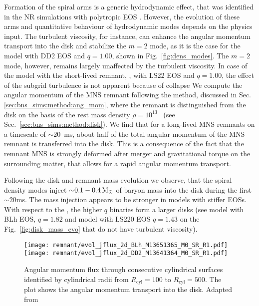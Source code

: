 Formation of the spiral arms is a generic hydrodynamic effect, that was identified 
in the \ac{NR} simulations with polytropic \ac{EOS} \citep{Bernuzzi:2013rza,Radice:2016gym}.
However, the evolution of these arms and quantitative behaviour of hydrodynamic
modes depends on the physics input. The turbulent viscosity, for instance, 
can enhance the angular momentum transport into the disk and stabilize the 
$m=2$ mode, as it is the case for the model with DD2 \ac{EOS} and $q=1.00$, shown
in Fig.~\ref{fig:dens_modes}.
The $m=2$ mode, however, remains largely unaffected by the turbulent viscosity.
In case of the model with the short-lived remnant, \ie, with LS22 \ac{EOS} and
$q=1.00$, the effect of the subgrid turbulence is not apparent because of collapse
%
We compute the angular momentum of the \ac{MNS} remnant following the method,
discussed in Sec.\ref{sec:bns_sims:method:ang_mom}, where the remnant is distinguished 
from the disk on the basis of the rest mass density $\rho=10^{13}$~\gcm{} 
(see Sec.~\ref{sec:bns_sims:method:disk}).
We find that for a long-lived \ac{MNS} remnants on a timescale of $\sim20$~ms, 
about half of the total angular momentum of the \ac{MNS} remnant is transferred 
into the disk. 
This is a consequence of the fact that the remnant \ac{MNS} is strongly deformed 
after merger and gravitational torque on the surrounding matter, 
that allows for a rapid angular momentum transport.

Following the disk and remnant mass evolution we observe, that the spiral 
density modes inject ${\sim}0.1-0.4\,{\text{M}_{\odot}}$ of baryon mass into the disk during the 
first ${\sim}20$ms. 
The mass injection appears to be stronger in models with stiffer \acp{EOS}. 
With respect to the \mr{}, the higher $q$ binaries form a larger disks 
(see model with BLh \ac{EOS}, $q=1.82$ and model with LS220 \ac{EOS} $q=1.43$ 
on the Fig.~\ref{fig:disk_mass_evo} that do not have turbulent viscosity).

\begin{figure}[t]
    \centering 
    \texttt{[image: remnant/evol\_jflux\_2d\_BLh\_M13651365\_M0\_SR\_R1.pdf]}
    \texttt{[image: remnant/evol\_jflux\_2d\_DD2\_M13641364\_M0\_SR\_R1.pdf]}
    \caption{Angular momentum flux through consecutive cylindrical
        surfaces identified by cylindrical radii from $R_{\text{cyl}}=100$ to $R_{\text{cyl}}=500$. The
        plot shows the angular momentum transport into the disk.
        Adapted from \citet{Nedora:2020pak}
    }
    \label{fig:disk_ang_mom_flux_map_blh_q1}
\end{figure}

